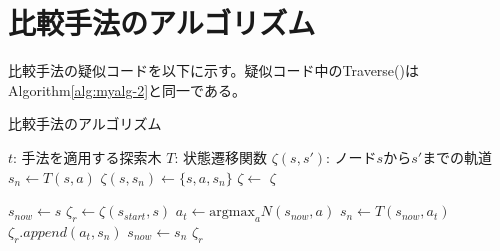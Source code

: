 \section{比較手法のアルゴリズム}
比較手法の疑似コードを以下に示す。疑似コード中のTraverse()は Algorithm\ref{alg:myalg-2}と同一である。
\begin{algorithm}
    \caption{比較手法のアルゴリズム}
    \begin{algorithmic}[1]       
        \State $t$: 手法を適用する探索木
        \State $T$: 状態遷移関数
        \State $\zeta(s, s')$: ノード$s$から$s'$までの軌道
           \State $s_n \gets T(s, a)$
           \State $\zeta(s, s_n) \gets \{s, a, s_n\}$
           \State $\zeta \gets$ 
           \Return $\zeta$
        \EndFunction
        
            \State $s_{now} \gets s$
            \State $\zeta_r \gets \zeta(s_{start}, s)$
                \State $a_t \gets \textrm{argmax}_a N(s_{now}, a)$
                \State $s_n \gets T(s_{now}, a_t)$
                \State $\zeta_r.append({a_t, s_n})$
                \State $s_{now} \gets s_n$
            \EndWhile
            \Return $\zeta_r$
        \EndFunction
       
        
    \end{algorithmic}
\end{algorithm}


